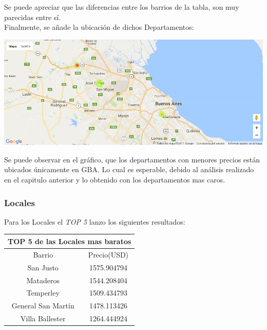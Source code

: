 \documentclass[a4paper, 10pt]{article}
\begin{document}
				Se puede apreciar que las diferencias entre los barrios de la tabla, son muy parecidas entre sí.\\
				Finalmente, se añade la ubicación de dichos Departamentos:

				\begin{center}
   		    				\includegraphics[width=\textwidth]{images/ubicDb}
				\end{center}

				Se puede observar en el gráfico, que los departamentos con menores precios están ubicados únicamente en GBA. Lo cual es esperable, debido al análisis realizado en el capitulo anterior y lo obtenido con los departamentos mas caros.

				\subsubsection{Locales}

					Para los Locales el \emph{TOP 5} lanzo los siguientes resultados:

					\begin{center}
						\begin{tabular}{ |c|c| }
							\hline
							\multicolumn{2}{|c|}{TOP 5 de las Locales mas baratos}\\
							\hline
							\hline
							Barrio & Precio(USD)\\
							\hline
							San Justo & 1575.904794 \\
							Mataderos & 1544.208404 \\
							Temperley & 1509.434793 \\
							General San Martín & 1478.113426 \\
							Villa Ballester 	& 1264.444924 \\
							\hline
						\end{tabular}
					\end{center}
\end{document}
